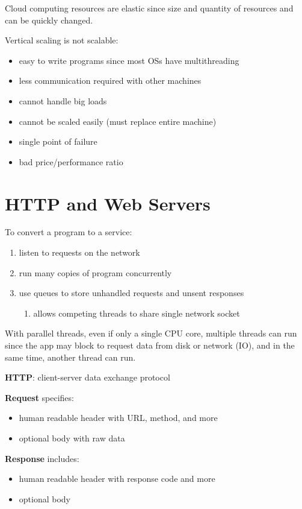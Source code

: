 \documentclass[11pt]{article}
\begin{document}
Cloud computing resources are elastic since size and quantity of resources
and can be quickly changed.

Vertical scaling is not scalable:
\begin{itemize}
\item easy to write programs since most OSs have multithreading
\item less communication required with other machines
\item cannot handle big loads
\item cannot be scaled easily (must replace entire machine)
\item single point of failure
\item bad price/performance ratio
\end{itemize}
\section{HTTP and Web Servers}
\label{sec:org51da123}
To convert a program to a service:
\begin{enumerate}
\item listen to requests on the network
\item run many copies of program concurrently
\item use queues to store unhandled requests and unsent responses
\begin{enumerate}
\item allows competing threads to share single network socket
\end{enumerate}
\end{enumerate}

With parallel threads, even if only a single CPU core, multiple threads can run
since the app may block to request data from disk or network (IO), and in the
same time, another thread can run.

\textbf{HTTP}: client-server data exchange protocol

\textbf{Request} specifies:
\begin{itemize}
\item human readable header with URL, method, and more
\item optional body with raw data
\end{itemize}

\textbf{Response} includes:
\begin{itemize}
\item human readable header with response code and more
\item optional body
\end{itemize}
\end{document}
